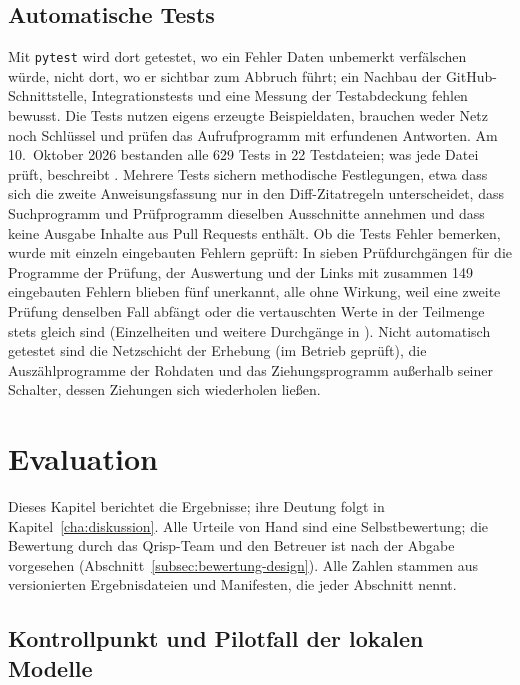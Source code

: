 \documentclass[11pt,a4paper]{report}
\begin{document}
\section{Automatische Tests}
\label{sec:impl-tests}

Mit \texttt{pytest} wird dort getestet, wo ein Fehler Daten unbemerkt
verfälschen würde, nicht dort, wo er sichtbar zum Abbruch führt; ein
Nachbau der GitHub-Schnittstelle, Integrationstests und eine Messung der
Testabdeckung fehlen bewusst. Die Tests nutzen eigens erzeugte
Beispieldaten, brauchen weder Netz noch Schlüssel und prüfen das
Aufrufprogramm mit erfundenen Antworten. Am 10.~Oktober 2026 bestanden
alle 629 Tests in 22 Testdateien; was jede Datei prüft, beschreibt
. Mehrere Tests sichern methodische Festlegungen,
etwa dass sich die zweite Anweisungsfassung nur in den Diff-Zitatregeln
unterscheidet, dass Suchprogramm und Prüfprogramm dieselben Ausschnitte
annehmen und dass keine Ausgabe Inhalte aus Pull Requests enthält. Ob
die Tests Fehler bemerken, wurde mit einzeln eingebauten Fehlern
geprüft: In sieben Prüfdurchgängen für die Programme der Prüfung, der
Auswertung und der Links mit zusammen 149 eingebauten Fehlern blieben
fünf unerkannt, alle ohne Wirkung, weil eine zweite Prüfung denselben
Fall abfängt oder die vertauschten Werte in der Teilmenge stets gleich
sind (Einzelheiten und weitere Durchgänge in ). Nicht
automatisch getestet sind die Netzschicht der Erhebung (im Betrieb
geprüft), die Auszählprogramme der Rohdaten und das Ziehungsprogramm
außerhalb seiner Schalter, dessen Ziehungen sich wiederholen ließen.


\chapter{Evaluation}
\label{cha:evaluation}

Dieses Kapitel berichtet die Ergebnisse; ihre Deutung folgt in
Kapitel~\ref{cha:diskussion}. Alle Urteile von Hand sind eine
Selbstbewertung; die Bewertung durch das Qrisp-Team und den Betreuer ist
nach der Abgabe vorgesehen
(Abschnitt~\ref{subsec:bewertung-design}). Alle Zahlen stammen aus
versionierten Ergebnisdateien und Manifesten, die jeder Abschnitt nennt.

\section{Kontrollpunkt und Pilotfall der lokalen Modelle}
\label{sec:eval-pilot-lokal}
\end{document}
